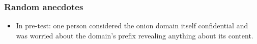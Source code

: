 \subsubsection{Random anecdotes}
\begin{itemize}
    \item In pre-test: one person considered the onion domain itself
        confidential and was worried about the domain's prefix revealing
        anything about its content.
\end{itemize}
